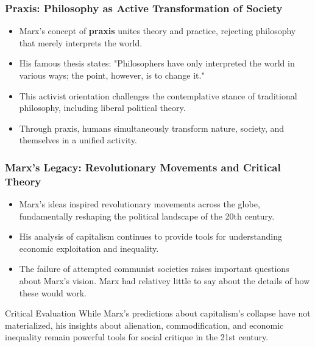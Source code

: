 \documentclass{beamer}
\begin{document}
\begin{frame}
\frametitle{Praxis: Philosophy as Active Transformation of Society}
\begin{itemize}
    \item Marx's concept of \textbf{praxis} unites theory and practice, rejecting philosophy that merely interprets the world.
    \item His famous thesis states: "Philosophers have only interpreted the world in various ways; the point, however, is to change it."
    \item This activist orientation challenges the contemplative stance of traditional philosophy, including liberal political theory.
    \item Through praxis, humans simultaneously transform nature, society, and themselves in a unified activity.
\end{itemize}

\begin{center}
\small
{}
\end{center}
\end{frame}

\begin{frame}
\frametitle{Marx's Legacy: Revolutionary Movements and Critical Theory}
\begin{itemize}
    \item Marx's ideas inspired revolutionary movements across the globe, fundamentally reshaping the political landscape of the 20th century.
    \item His analysis of capitalism continues to provide tools for understanding economic exploitation and inequality.
    \item The failure of attempted communist societies raises important questions about Marx's vision. Marx had relativey little to say about the details of how these would work.
\end{itemize}

\begin{alertblock}{Critical Evaluation}
While Marx's predictions about capitalism's collapse have not materialized, his insights about alienation, commodification, and economic inequality remain powerful tools for social critique in the 21st century.
\end{alertblock}
\end{frame}
\end{document}
